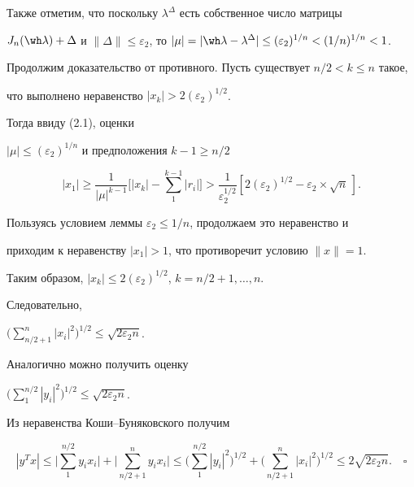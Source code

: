 Также отметим, что поскольку $\lambda^{\Delta}$ есть собственное число матрицы


$J_n(\wh\lambda)+\Delta$ и $\|\Delta\|\le\varepsilon_2$, то $|\mu|=|\wh\lambda-


\lambda^{\Delta}|\le (\varepsilon_2)^{1/n}<(1/n)^{1/n}<1$.





Продолжим доказательство от противного. Пусть существует $n/2<k\le n$ такое,


что выполнено неравенство $|x_k|>2(\varepsilon_2)^{1/2}$.


Тогда ввиду (2.1), оценки


$|\mu|\le (\varepsilon_2)^{1/n}$ и предположения $k-1\ge n/2$


$$


|x_1|\ge \frac{1}{|\mu|^{k-1}}\bigg[|x_k|-\sum\limits_1^{k-1}|r_i|


\bigg]> \frac{1}{\varepsilon_2^{1/2}}


[2(\varepsilon_2)^{1/2}-\varepsilon_2\times \sqrt{n}\,].


$$


Пользуясь условием леммы $\varepsilon_2\le 1/n$, продолжаем это неравенство и


приходим к неравенству $|x_1|>1$, что противоречит условию $\|x\|=1$.


Таким образом, $|x_k|\le 2(\varepsilon_2)^{1/2}$, $k=n/2+1,\dotsc,n$.





Следовательно,


$\Big(\sum\limits_{n/2+1}^n |x_i|^2\Big)^{1/2}\le \sqrt{2\varepsilon_2 n}$.


Аналогично можно получить оценку


$\Big(\sum\limits_1^{n/2} |y_i|^2\Big)^{1/2}\le \sqrt{2\varepsilon_2 n}$.


Из неравенства Коши--Буняковского получим


$$


|y^T x|\le \bigg|\sum\limits_{1}^{n/2}y_i x_i\bigg|+


\bigg|\sum\limits_{n/2+1}^{n}y_i x_i\bigg|\le


\bigg(\sum\limits_{1}^{n/2}|y_i|^2\bigg)^{1/2}+


\bigg(\sum\limits_{n/2+1}^n |x_i|^2


\bigg)^{1/2}\le 2\sqrt{2\varepsilon_2 n}.\quad\square


$$





